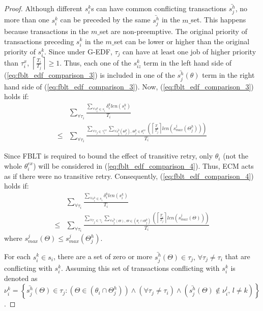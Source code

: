 \documentclass[prodmode,acmtecs]{acmsmall}
\begin{document}
\begin{compactenum}
\begin{proof}
Although different $s_{i}^{k}$s can have common conflicting transactions
$\bar{s_{j}^{h}}$, no more than one $s_{i}^{k}$ can be preceded
by the same $\bar{s_{j}^{h}}$ in the $m\_$set. This happens because
transactions in the $m\_$set are non-preemptive. The original priority
of transactions preceding $s_{i}^{k}$ in the $m\_$set can be 
lower or higher than the original priority of $s_{i}^{k}$. Since under
G-EDF, $\tau_{j}$ can have at least one job of higher
priority than $\tau_{i}^{x}$, $\left\lceil \frac{T_{i}}{T_{j}}\right\rceil \ge1$.
Thus, each one of the $s_{iz}^{k}$ term in the left hand side of (\ref{eq:fblt_edf_comparison_3})
is included in one of the $\bar{s_{j}^{h}}(\theta)$ term in the right hand side of (\ref{eq:fblt_edf_comparison_3}). 
%
Now, (\ref{eq:fblt_edf_comparison_3}) holds if:
\begin{eqnarray}
 & \sum_{\forall\tau_{i}}\frac{\sum_{\forall s_{i}^{k}\in s_{i}}\delta_i^klen(s_{i}^{k})}{T_{i}}\label{eq:fblt_edf_comparison_4}\\
\le &
\sum_{\forall\tau_{i}}\frac{\sum_{\forall\tau_{j}\in\gamma_{i}^{ex}}\sum_{\forall \bar{s_{j}^{h}}(\Theta_j^h),\,\Theta_j^h\in\theta_{i}^{ex}}\left(\left\lceil \frac{T_{i}}{T_{j}}\right\rceil len\left(s_{max}^{j}(\Theta_j^h)\right)\right)}{T_{i}}\nonumber 
\end{eqnarray}

Since FBLT is required to bound the effect of transitive retry, only $\theta_i$ (not the whole $\theta_i^{ex}$) will be considered in (\ref{eq:fblt_edf_comparison_4}). Thus, ECM acts as if there were no transitive retry. Consequently, (\ref{eq:fblt_edf_comparison_4}) holds if:
\begin{eqnarray}
 & \sum_{\forall\tau_{i}}\frac{\sum_{\forall s_{i}^{k}\in s_{i}}\delta_i^klen(s_{i}^{k})}{T_{i}}\label{eq:fblt_edf_comparison_4_1}\\
\le &
\sum_{\forall\tau_{i}}\frac{\sum_{\forall\tau_{j}\in\gamma_{i}}\sum_{\forall \bar{s_{j}^{h}}(\Theta),\,\Theta\in(\theta_{i}\cap\Theta_j^h)}\left(\left\lceil \frac{T_{i}}{T_{j}}\right\rceil len\left(s_{max}^{j}(\Theta)\right)\right)}{T_{i}}\nonumber 
\end{eqnarray}
where $s_{max}^j(\Theta) \le s_{max}^j(\Theta_j^h)$. 

For each $s_{i}^{k}\in s_{i}$, there are a set of zero or more $\bar{s_{j}^{h}}(\Theta)\in\tau_{j},\,\forall\tau_{j}\ne\tau_{i}$
that are conflicting with $s_{i}^{k}$. Assuming this set of transactions conflicting with $s_{i}^{k}$ is denoted as $\nu_{i}^{k}=\left\{\bar{s_{j}^{h}}(\Theta)\in\tau_{j}:\left(\Theta\in(\theta_{i}\cap\Theta_j^h)\right)\wedge\left(\forall\tau_{j}\ne\tau_{i}\right)\wedge\left(\bar{s_{j}^{h}}(\Theta)\not\in\nu_{i}^{l},\, l\ne k\right)\right\}$.



\end{proof}
\end{compactenum}
\end{document}
